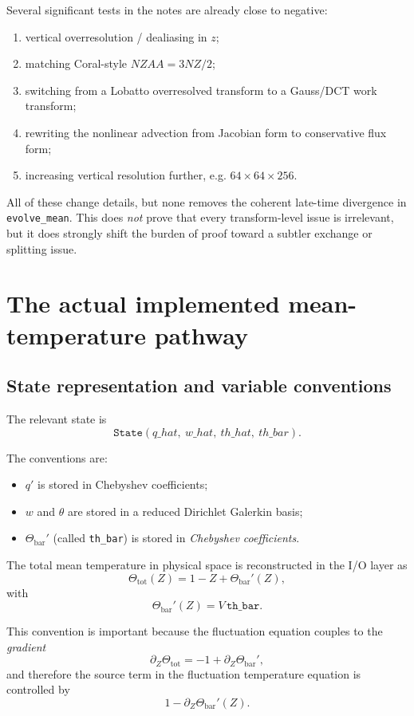 \documentclass[11pt]{article}
\begin{document}
Several significant tests in the notes are already close to negative:

\begin{enumerate}
\item vertical overresolution / dealiasing in $z$;
\item matching Coral-style $NZAA = 3NZ/2$;
\item switching from a Lobatto overresolved transform to a Gauss/DCT work transform;
\item rewriting the nonlinear advection from Jacobian form to conservative flux form;
\item increasing vertical resolution further, e.g. $64\times 64 \times 256$.
\end{enumerate}

All of these change details, but none removes the coherent late-time divergence in \texttt{evolve\_mean}. This does \emph{not} prove that every transform-level issue is irrelevant, but it does strongly shift the burden of proof toward a subtler exchange or splitting issue.

\section{The actual implemented mean-temperature pathway}

\subsection{State representation and variable conventions}

The relevant state is
\[
\texttt{State}(q\_hat,\ w\_hat,\ th\_hat,\ th\_bar).
\]

The conventions are:

\begin{itemize}
\item $q'$ is stored in Chebyshev coefficients;
\item $w$ and $\theta$ are stored in a reduced Dirichlet Galerkin basis;
\item $\Theta_{\mathrm{bar}}'$ (called \texttt{th\_bar}) is stored in \emph{Chebyshev coefficients}.
\end{itemize}

The total mean temperature in physical space is reconstructed in the I/O layer as
\[
\Theta_{\mathrm{tot}}(Z)
=
1 - Z + \Theta_{\mathrm{bar}}'(Z),
\]
with
\[
\Theta_{\mathrm{bar}}'(Z)
=
V\, \texttt{th\_bar}.
\]

This convention is important because the fluctuation equation couples to the \emph{gradient}
\[
\partial_Z \Theta_{\mathrm{tot}} = -1 + \partial_Z \Theta_{\mathrm{bar}}',
\]
and therefore the source term in the fluctuation temperature equation is controlled by
\[
1 - \partial_Z \Theta_{\mathrm{bar}}'(Z).
\]
\end{document}
